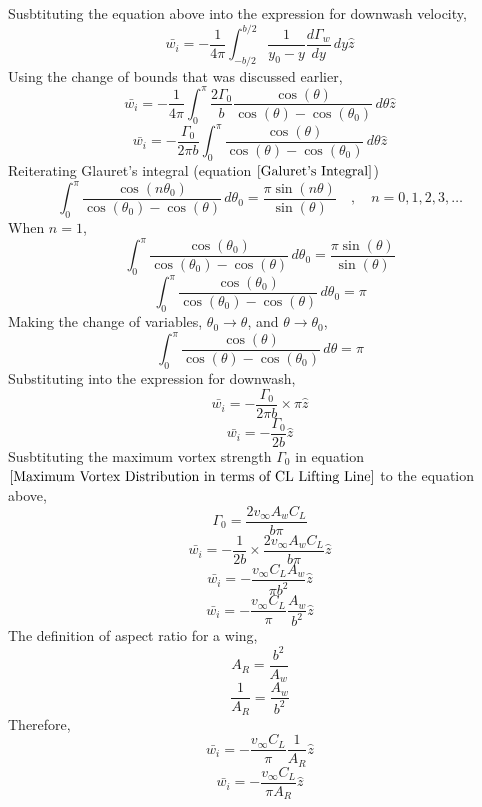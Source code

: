 \documentclass[a4paper, 12pt]{report}
\begin{document}
\begin{center}
Susbtituting the equation above into the expression for downwash velocity, 
$$\bar{w_{i}} = -\frac{1}{4\pi} \int^{b/2}_{-b/2}\frac{1}{y_{0}-y}\frac{d\Gamma_{w}}{dy} \,dy\hat{z}$$
Using the change of bounds that was discussed earlier, 
$$\bar{w_{i}} = -\frac{1}{4\pi} \int^{\pi}_{0} \frac{2\Gamma_{0}}{b}\frac{\cos(\theta)}{\cos(\theta) - \cos(\theta_{0})}\,d\theta\hat{z}$$
$$\bar{w_{i}} = -\frac{\Gamma_{0}}{2\pi b} \int^{\pi}_{0} \frac{\cos(\theta)}{\cos(\theta) - \cos(\theta_{0})}\,d\theta\hat{z}$$
Reiterating Glauret's integral (equation $\ref{Galuret's Integral}$)
$$\int^{\pi}_{0} \frac{\cos(n\theta_{0})}{\cos(\theta_{0}) - \cos(\theta)} \,d\theta_{0} = \frac{\pi \sin(n\theta)}{\sin(\theta)} \quad,\quad n = 0,1,2,3,\dots$$
When $n = 1$,
$$\int^{\pi}_{0} \frac{\cos(\theta_{0})}{\cos(\theta_{0}) - \cos(\theta)} \,d\theta_{0} = \frac{\pi \sin(\theta)}{\sin(\theta)}$$
$$\int^{\pi}_{0} \frac{\cos(\theta_{0})}{\cos(\theta_{0}) - \cos(\theta)} \,d\theta_{0} = \pi$$
Making the change of variables, $\theta_{0} \to \theta$, and $\theta \to \theta_{0}$,
$$\int^{\pi}_{0} \frac{\cos(\theta)}{\cos(\theta) - \cos(\theta_{0})} \,d\theta = \pi$$
Substituting into the expression for downwash,
$$\bar{w_{i}} = -\frac{\Gamma_{0}}{2\pi b}\times \pi\hat{z}$$
\begin{equation}
\bar{w_{i}} = -\frac{\Gamma_{0}}{2b}\hat{z}
\label{downwash lifting line thry}
\end{equation}
Susbtituting the maximum vortex strength $\Gamma_{0}$ in equation $\ref{Maximum Vortex Distribution in terms of CL Lifting Line}$ to the equation above,
$$\Gamma_{0} = \frac{2 v_{\infty}A_{w} C_{L}}{b\pi}$$
$$\bar{w_{i}} = -\frac{1}{2b}\times\frac{2 v_{\infty}A_{w} C_{L}}{b\pi}\hat{z}$$
$$\bar{w_{i}} = -\frac{v_{\infty}C_{L}A_{w}}{\pi b^{2}}\hat{z}$$
$$\bar{w_{i}} = -\frac{v_{\infty}C_{L}}{\pi}\frac{A_{w}}{b^{2}}\hat{z}$$
The definition of aspect ratio for a wing,
$$A_{R} = \frac{b^{2}}{A_{w}}$$
$$\frac{1}{A_{R}} = \frac{A_{w}}{b^{2}}$$
Therefore,
$$\bar{w_{i}} = -\frac{v_{\infty}C_{L}}{\pi}\frac{1}{A_{R}}\hat{z}$$
\begin{equation}
\bar{w_{i}} = -\frac{v_{\infty}C_{L}}{\pi A_{R}}\hat{z}
\label{downwash lifting line in terms of aspect ratio and CL}
\end{equation}



\end{center}
\end{document}
